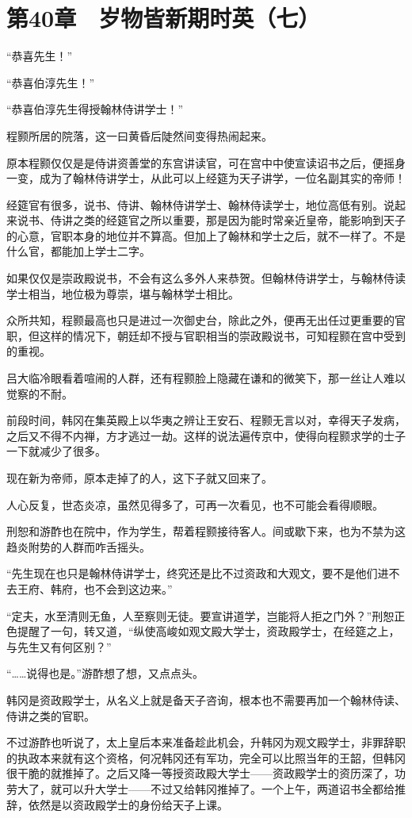 \section{第40章　岁物皆新期时英（七）}

“恭喜先生！”

“恭喜伯淳先生！”

“恭喜伯淳先生得授翰林侍讲学士！”

程颢所居的院落，这一曰黄昏后陡然间变得热闹起来。

原本程颢仅仅是是侍讲资善堂的东宫讲读官，可在宫中中使宣读诏书之后，便摇身一变，成为了翰林侍讲学士，从此可以上经筵为天子讲学，一位名副其实的帝师！

经筵官有很多，说书、侍讲、翰林侍讲学士、翰林侍读学士，地位高低有别。说起来说书、侍讲之类的经筵官之所以重要，那是因为能时常亲近皇帝，能影响到天子的心意，官职本身的地位并不算高。但加上了翰林和学士之后，就不一样了。不是什么官，都能加上学士二字。

如果仅仅是崇政殿说书，不会有这么多外人来恭贺。但翰林侍讲学士，与翰林侍读学士相当，地位极为尊崇，堪与翰林学士相比。

众所共知，程颢最高也只是进过一次御史台，除此之外，便再无出任过更重要的官职，但这样的情况下，朝廷却不授与官职相当的崇政殿说书，可知程颢在宫中受到的重视。

吕大临冷眼看着喧闹的人群，还有程颢脸上隐藏在谦和的微笑下，那一丝让人难以觉察的不耐。

前段时间，韩冈在集英殿上以华夷之辨让王安石、程颢无言以对，幸得天子发病，之后又不得不内禅，方才逃过一劫。这样的说法遍传京中，使得向程颢求学的士子一下就减少了很多。

现在新为帝师，原本走掉了的人，这下子就又回来了。

人心反复，世态炎凉，虽然见得多了，可再一次看见，也不可能会看得顺眼。

刑恕和游酢也在院中，作为学生，帮着程颢接待客人。间或歇下来，也为不禁为这趋炎附势的人群而咋舌摇头。

“先生现在也只是翰林侍讲学士，终究还是比不过资政和大观文，要不是他们进不去王府、韩府，也不会到这边来。”

“定夫，水至清则无鱼，人至察则无徒。要宣讲道学，岂能将人拒之门外？”刑恕正色提醒了一句，转又道，“纵使高峻如观文殿大学士，资政殿学士，在经筵之上，与先生又有何区别？”

“……说得也是。”游酢想了想，又点点头。

韩冈是资政殿学士，从名义上就是备天子咨询，根本也不需要再加一个翰林侍读、侍讲之类的官职。

不过游酢也听说了，太上皇后本来准备趁此机会，升韩冈为观文殿学士，非罪辞职的执政本来就有这个资格，何况韩冈还有军功，完全可以比照当年的王韶，但韩冈很干脆的就推掉了。之后又降一等授资政殿大学士——资政殿学士的资历深了，功劳大了，就可以升大学士——不过又给韩冈推掉了。一个上午，两道诏书全都给推辞，依然是以资政殿学士的身份给天子上课。


